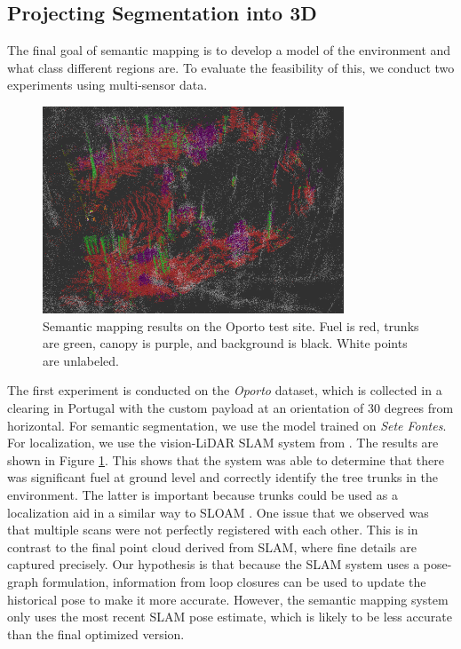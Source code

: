 \subsection{Projecting Segmentation into 3D}
The final goal of semantic mapping is to develop a model of the environment and what class different regions are. To evaluate the feasibility of this, we conduct two experiments using multi-sensor data.

\begin{figure}[H]
    \centering
    \includegraphics[width=0.8\textwidth]{figs/results/semantic_mapping/semantic_cloud_first_approach.png}
    \caption{Semantic mapping results on the Oporto test site. Fuel is red, trunks are green, canopy is purple, and background is black. White points are unlabeled.}
    \label{fig:results:semantic_mapping_original}
\end{figure}

The first experiment is conducted on the \textit{Oporto} dataset, which is collected in a clearing in Portugal with the custom payload at an orientation of 30 degrees from horizontal. For semantic segmentation, we use the model trained on \textit{Sete Fontes}. For localization, we use the vision-LiDAR SLAM system from \cite{RussellUnmannedMitigation}.
The results are shown in Figure \ref{fig:results:semantic_mapping_original}. This shows that the system was able to determine that there was significant fuel at ground level and correctly identify the tree trunks in the environment. The latter is important because trunks could be used as a localization aid in a similar way to SLOAM \cite{Chen2020SLOAM:Inventory}. One issue that we observed was that multiple scans were not perfectly registered with each other. This is in contrast to the final point cloud derived from SLAM, where fine details are captured precisely. Our hypothesis is that because the SLAM system uses a pose-graph \cite{Dellaert2017FactorPerception} formulation, information from loop closures can be used to update the historical pose to make it more accurate. However, the semantic mapping system only uses the most recent SLAM pose estimate, which is likely to be less accurate than the final optimized version.


